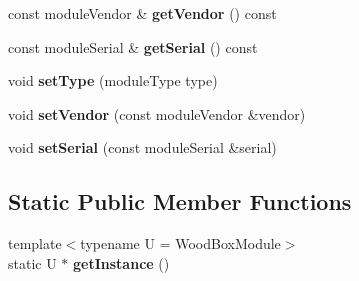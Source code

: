 \begin{DoxyCompactItemize}
const module\+Vendor \& {\bfseries get\+Vendor} () const
\item 
\mbox{\label{classwood_box_1_1module_1_1_wood_box_module_aa8fc11fbebc7904f144bc40b7654a215}} 
const module\+Serial \& {\bfseries get\+Serial} () const
\item 
\mbox{\label{classwood_box_1_1module_1_1_wood_box_module_a807efbd90ccdd796bfc62c15bfbc81ab}} 
void {\bfseries set\+Type} (module\+Type type)
\item 
\mbox{\label{classwood_box_1_1module_1_1_wood_box_module_af19696ed5702e009a584065892ed1501}} 
void {\bfseries set\+Vendor} (const module\+Vendor \&vendor)
\item 
\mbox{\label{classwood_box_1_1module_1_1_wood_box_module_affcbb54be4585637a88aade3e29b8a93}} 
void {\bfseries set\+Serial} (const module\+Serial \&serial)
\end{DoxyCompactItemize}
\subsection*{Static Public Member Functions}
\begin{DoxyCompactItemize}
\item 
\mbox{\label{classwood_box_1_1module_1_1_wood_box_module_a3f13bd3a6318ddf2a7db84f86b198a49}} 
{\footnotesize template$<$typename U  = Wood\+Box\+Module$>$ }\\static U $\ast$ {\bfseries get\+Instance} ()
\end{DoxyCompactItemize}

